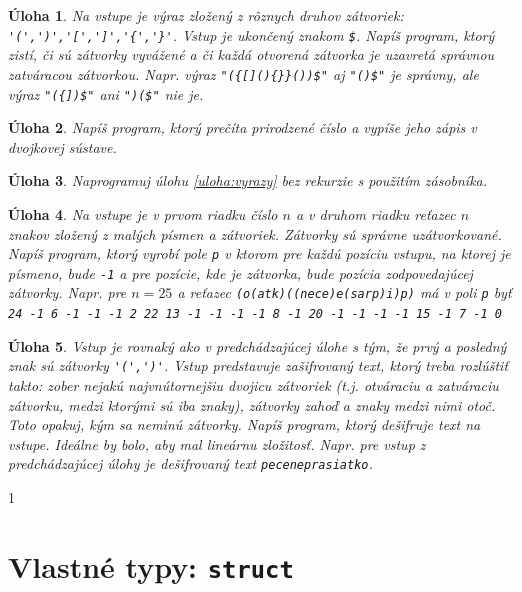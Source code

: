 \documentclass[10pt]{article}
\def\prg{\lstinline}
\newtheorem{uloha}{Úloha}
\def\sectxiv{1}  %
\def\sectxiv{0}  %
\begin{document}
\begin{uloha}
  Na vstupe je výraz zložený z rôznych druhov zátvoriek: \prg!'(',')','[',']','{','}'!.
  Vstup je ukončený znakom {\tt \$}.
  Napíš program, ktorý zistí, či sú zátvorky vyvážené a či každá otvorená zátvorka
  je uzavretá správnou zatváracou zátvorkou. Napr. výraz \prg!"({[](){}}())$"!
  aj \prg!"()$"!
  je správny, ale výraz \prg!"({])$"! ani \prg!")($"! nie je.
\end{uloha}

\begin{uloha}
  Napíš program, ktorý prečíta prirodzené číslo a vypíše jeho zápis v dvojkovej
  sústave.
\end{uloha}

\begin{uloha}
Naprogramuj úlohu \ref{uloha:vyrazy} bez rekurzie s použitím zásobníka.
\end{uloha}

\begin{uloha}
  \label{uloha:zatvorky}
Na vstupe je v prvom riadku číslo $n$ a v druhom riadku reťazec $n$ znakov 
zložený z malých písmen a zátvoriek. Zátvorky sú správne uzátvorkované.
Napíš program, ktorý vyrobí pole {\tt p} v ktorom pre každú pozíciu vstupu,
na ktorej je písmeno, bude {\tt -1} a pre pozície, kde je zátvorka, bude
pozícia zodpovedajúcej zátvorky. Napr. pre $n=25$ a reťazec 
  {\tt (o(atk)((nece)e(sarp)i)p)} má v poli {\tt p} byť\\
  {\tt 24 -1 6 -1 -1 -1 2 22 13 -1 -1 -1 -1 8 -1 20 -1 -1 -1 -1 15 -1 7 -1 0}
\end{uloha}

\begin{uloha}
  Vstup je rovnaký ako v predchádzajúcej úlohe s tým, že prvý a posledný znak 
  sú zátvorky \prg!'(',')'!. Vstup predstavuje zašifrovaný text, ktorý treba 
  rozlúštiť takto: zober nejakú najvnútornejšiu dvojicu zátvoriek (t.j. otváraciu
  a zatváraciu zátvorku, medzi ktorými sú iba znaky), zátvorky zahoď a znaky medzi nimi
  otoč. Toto opakuj, kým sa neminú zátvorky. Napíš program, ktorý dešifruje text na vstupe.
  Ideálne by bolo, aby mal lineárnu zložitosť.
  Napr. pre vstup z predchádzajúcej úlohy je dešifrovaný text {\tt peceneprasiatko}.
\end{uloha}

\fi


\if\sectxiv1
\section{Vlastné typy: \prg!struct!}
\end{document}
